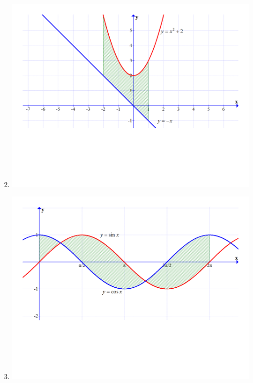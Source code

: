\documentclass[12pt]{article}
\newif\ifans
\begin{document}
\begin{enumerate}
\setcounter{enumi}{1}

\item \text{ }

\begin{center}

\includegraphics[scale=0.3]{graph1.pdf}

\ifans{\fbox{$A=\frac{15}{2}$}} \fi

\end{center}

\item \text{ }

\begin{center}

\includegraphics[scale=0.3]{graph2.pdf}


\end{center}
\end{enumerate}
\end{document}
